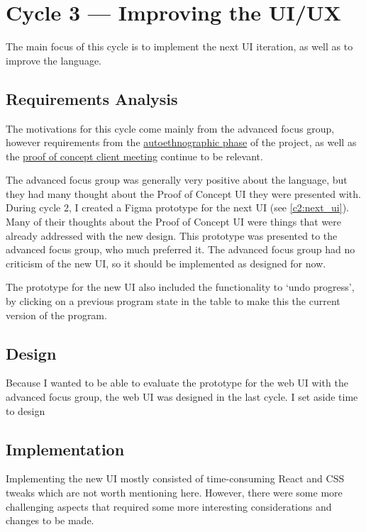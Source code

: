 \chapter{Cycle 3 --- Improving the UI/UX}
The main focus of this cycle is to implement the next UI iteration, as well as to improve the language. 

\section{Requirements Analysis}
The motivations for this cycle come mainly from the advanced focus group, however requirements from the \hyperref[sec:c1_autoethnography]{autoethnographic phase} of the project, as well as the \hyperref[eval:c1]{proof of concept client meeting} continue to be relevant. 

The advanced focus group was generally very positive about the language, but they had many thought about the Proof of Concept UI they were presented with. During cycle 2, I created a Figma prototype for the next UI (see \ref{c2:next_ui}). Many of their thoughts about the Proof of Concept UI were things that were already addressed with the new design. This prototype was presented to the advanced focus group, who much preferred it. The advanced focus group had no criticism of the new UI, so it should be implemented as designed for now. 

The prototype for the new UI also included the functionality to `undo progress', by clicking on a previous program state in the table to make this the current version of the program. 

\section{Design}
Because I wanted to be able to evaluate the prototype for the web UI with the advanced focus group, the web UI was designed in the last cycle. I set aside time to design 



\section{Implementation}
Implementing the new UI mostly consisted of time-consuming React and CSS tweaks which are not worth mentioning here. However, there were some more challenging aspects that required some more interesting considerations and changes to be made. 

